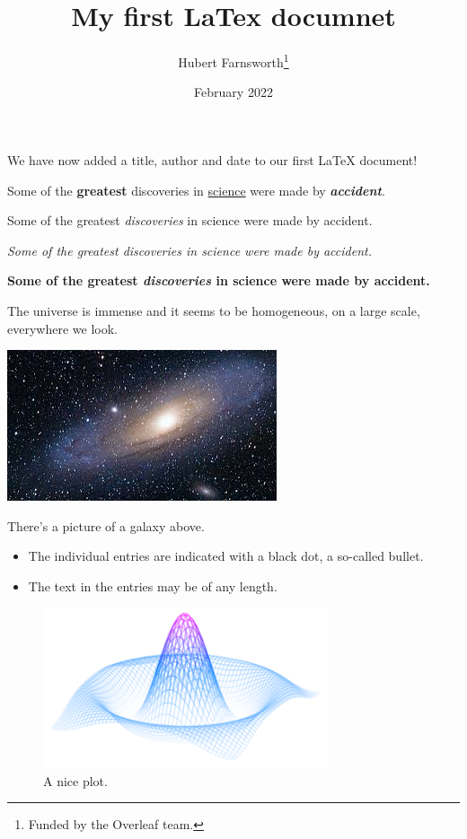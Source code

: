 \documentclass[12pt, letterpaper]{article}
\title{My first LaTex documnet}
\author{Hubert Farnsworth\thanks{Funded by the Overleaf team.}}
\date{February 2022}
\begin{document}
\maketitle
We have now added a title, author and date to our first \LaTeX{} document!
\parindent0pt%

Some of the \textbf{greatest}
discoveries in \underline{science} 
were made by \textbf{\textit{accident}}.

Some of the greatest \emph{discoveries} in science 
were made by accident.

\textit{Some of the greatest \emph{discoveries} 
in science were made by accident.}

\textbf{Some of the greatest \emph{discoveries} 
in science were made by accident.}

The universe is immense and it seems to be homogeneous, 
on a large scale, everywhere we look.

\includegraphics{universe}  
 
There's a picture of a galaxy above.

\begin{itemize}
    \item The individual entries are indicated with a black dot, a so-called bullet.
    \item The text in the entries may be of any length.
\end{itemize}

\begin{figure}[h]
    \centering
    \includegraphics[width=0.75\textwidth]{mesh}
    \caption{A nice plot.}
    \label{fig:mesh1}
\end{figure}
 
\end{document}
